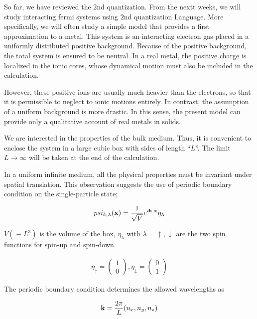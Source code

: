 So far, we have reviewed the $2$nd quantization. From the nextt weeks, we will study interacting fermi systems using $2$nd quantization Language. More specifically, we will often study a simple model that provides a first approximation to a metal. This system is an interacting electron gas placed in a uniformly distributed positive background. Because of the positive background, the total system is ensured to be neutral. In a real metal, the positive charge is localized in the ionic cores, whose dynamical motion must also be included in the calculation. 

However, these positive ions are usually much heavier than the electrons, so that it is permissible to neglect to ionic motions entirely. In contrast, the assumption of a uniform background is more drastic. In this sense, the present model can provide only a qualitative account of real metals in solids. 

We are interested in the properties of the bulk medium. Thus, it is convenient to enclose the system in a large cubic box with sides of length ``$L$''. The limit $L\rightarrow\infty$ will be taken at the end of the calculation. 

In a uniform infinite medium, all the physical properties must be invariant under spatial translation. This observation suggests the use of periodic boundary condition on the single-particle state;

\begin{align}
psi_{k,\lambda}({\bf x}) = \frac{1}{\sqrt{V}}e^{i\bf k\cdot x}\eta_{\lambda}
\end{align}

$V(\equiv L^3)$ is the volume of the box, $\eta_\lambda$ with $\lambda = \uparrow,\downarrow$ are the two spin functions for spin-up and spin-down

\begin{align}
\eta_\uparrow = \left(\begin{matrix}1\\0\end{matrix}\right),\eta_\downarrow = \left(\begin{matrix}0\\1\end{matrix}\right)
\end{align}

The periodic boundary condition determines the allowed wavelengths as

\begin{align}
{\bf k} = \frac{2\pi}{L}(n_x,n_y,n_z)
\end{align}

